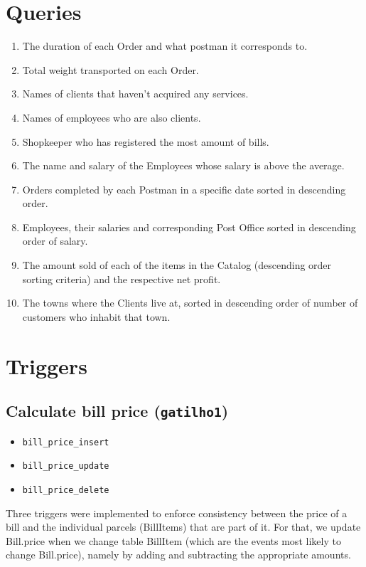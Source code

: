\documentclass{report}[a4paper]
\theoremstyle{remark}
\begin{document}
\chapter{Queries}

\begin{enumerate}
    \item The duration of each Order and what postman it corresponds to.
    \item Total weight transported on each Order.
    \item Names of clients that haven't acquired any services.
    \item Names of employees who are also clients.
    \item Shopkeeper who has registered the most amount of bills.
    \item The name and salary of the Employees whose salary is above the average.
    \item Orders completed by each Postman in a specific date sorted in descending order.
    \item Employees, their salaries and corresponding Post Office sorted in descending order of salary.
    \item The amount sold of each of the items in the Catalog (descending order sorting criteria) and the respective net profit.
    \item The towns where the Clients live at, sorted in descending order of number of customers who inhabit that town.
\end{enumerate}

\chapter{Triggers}
\section{Calculate bill price (\texttt{gatilho1})}
\begin{itemize}
    \item \texttt{bill\_price\_insert}
    \item \texttt{bill\_price\_update}
    \item \texttt{bill\_price\_delete}
\end{itemize}
Three triggers were implemented to enforce consistency between the price of a bill and the individual parcels (BillItems) that are part of it. For that, we update Bill.price when we change table BillItem (which are the events most likely to change Bill.price), namely by adding and subtracting the appropriate amounts.
\end{document}
